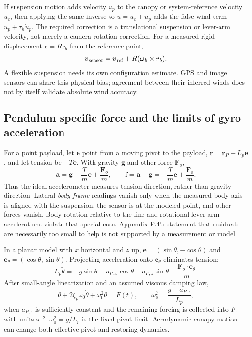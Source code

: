 If suspension motion adds velocity $u_p$ to the canopy or system-reference
velocity $u_c$, then applying the same inverse to $u=u_c+u_p$ adds
the false wind term $u_p+\tau_h\dot u_p$.
The required correction is a translational suspension or lever-arm velocity,
not merely a camera rotation correction. For a measured rigid displacement
$\boldsymbol r=R\boldsymbol r_b$ from the reference point,
\begin{equation}
 \boldsymbol v_{\rm sensor}=\boldsymbol v_{\mathrm{ref}}
                  +R(\boldsymbol\omega_b\times\boldsymbol r_b).
\end{equation}
A flexible suspension needs its own configuration estimate. GPS and image
sensors can share this physical bias; agreement between their inferred winds
does not by itself validate absolute wind accuracy.

\subsection{Pendulum specific force and the limits of gyro acceleration}

For a point payload, let $\boldsymbol e$ point from a moving pivot to the
payload, $\boldsymbol r=\boldsymbol r_P+L_p\boldsymbol e$, and let tension
be $-T\boldsymbol e$. With gravity $\boldsymbol g$ and other force
$\boldsymbol F_o$,
\begin{equation}
 \boldsymbol a=\boldsymbol g-\frac{T}{m}\boldsymbol e
                         +\frac{\boldsymbol F_o}{m},\qquad
 \boldsymbol f=\boldsymbol a-\boldsymbol g
             =-\frac{T}{m}\boldsymbol e+\frac{\boldsymbol F_o}{m}.
\end{equation}
Thus the ideal accelerometer measures tension direction, rather than gravity
direction. Lateral \emph{body-frame} readings vanish only when the measured
body axis is aligned with the suspension, the sensor is at the modeled
point, and other forces vanish. Body rotation relative to the line and
rotational lever-arm accelerations violate that special case. Appendix
F.4's statement that residuals are necessarily too small to help is not
supported by a measurement or model.

In a planar model with $x$ horizontal and $z$ up,
$\boldsymbol e=(\sin\theta,-\cos\theta)$ and
$\boldsymbol e_\theta=(\cos\theta,\sin\theta)$.
Projecting acceleration onto $\boldsymbol e_\theta$ eliminates tension:
\begin{equation}
 L_p\ddot\theta=-g\sin\theta
 -a_{P,x}\cos\theta-a_{P,z}\sin\theta
 +\frac{\boldsymbol F_o\cdot\boldsymbol e_\theta}{m}.
\end{equation}
After small-angle linearization and an assumed viscous damping law,
\begin{equation}
 \ddot\theta+2\zeta_p\omega_0\dot\theta+\omega_0^2\theta=F(t),
 \qquad \omega_0^2=\frac{g+a_{P,z}}{L_p},
\end{equation}
when $a_{P,z}$ is sufficiently constant and the remaining forcing is
collected into $F$, with units $\mathrm{s^{-2}}$.
$\omega_0^2=g/L_p$ is the fixed-pivot limit. Aerodynamic canopy motion can
change both effective pivot and restoring dynamics.

